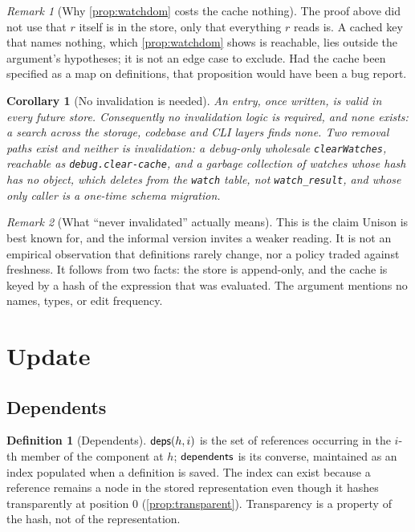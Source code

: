 \documentclass[11pt]{article}
\theoremstyle{definition}
\newtheorem{definition}{Definition}[section]
\theoremstyle{plain}
\newtheorem{corollary}{Corollary}[section]
\theoremstyle{remark}
\newtheorem{remark}{Remark}[section]
\begin{document}
\begin{remark}[Why \cref{prop:watchdom} costs the cache nothing]\label{rem:watchdom-ok}
The proof above did not use that $r$ itself is in the store, only that everything $r$ reads is. A
cached key that names nothing, which \cref{prop:watchdom} shows is reachable, lies outside the
argument's hypotheses; it is not an edge case to exclude. Had the cache been specified as a map on
definitions, that proposition would have been a bug report.
\end{remark}

\begin{corollary}[No invalidation is needed]\label{cor:wnoinval}
An entry, once written, is valid in every future store. Consequently no invalidation logic is
required, and none exists: a search across the storage, codebase and CLI layers finds none. Two
removal paths exist and neither is invalidation: a debug-only wholesale \texttt{clear\-Watches},
reachable as \texttt{debug.clear-cache}, and a garbage collection of watches whose hash has no
object, which deletes from the \texttt{watch} table, not \texttt{watch\_result}, and whose only
caller is a one-time schema migration.
\end{corollary}

\begin{remark}[What ``never invalidated'' actually means]\label{rem:cachemeaning}
This is the claim Unison is best known for, and the informal version invites a weaker reading. It is
not an empirical observation that definitions rarely change, nor a policy traded against freshness.
It follows from two facts: the store is append-only, and the cache is keyed by a hash of the
expression that was evaluated. The argument mentions no names, types, or edit frequency.
\end{remark}

\section{Update}\label{sec:uupdate}

\subsection{Dependents}

\begin{definition}[Dependents]\label{def:dependents}
$\mathsf{deps}(h,i)$ is the set of references occurring in the $i$-th member of the component at $h$;
$\mathsf{dependents}$ is its converse, maintained as an index populated when a definition is saved. The index
can exist because a reference remains a node in the stored representation even though it hashes
transparently at position $0$ (\cref{prop:transparent}). Transparency is a property of the hash, not
of the representation.
\end{definition}
\end{document}
